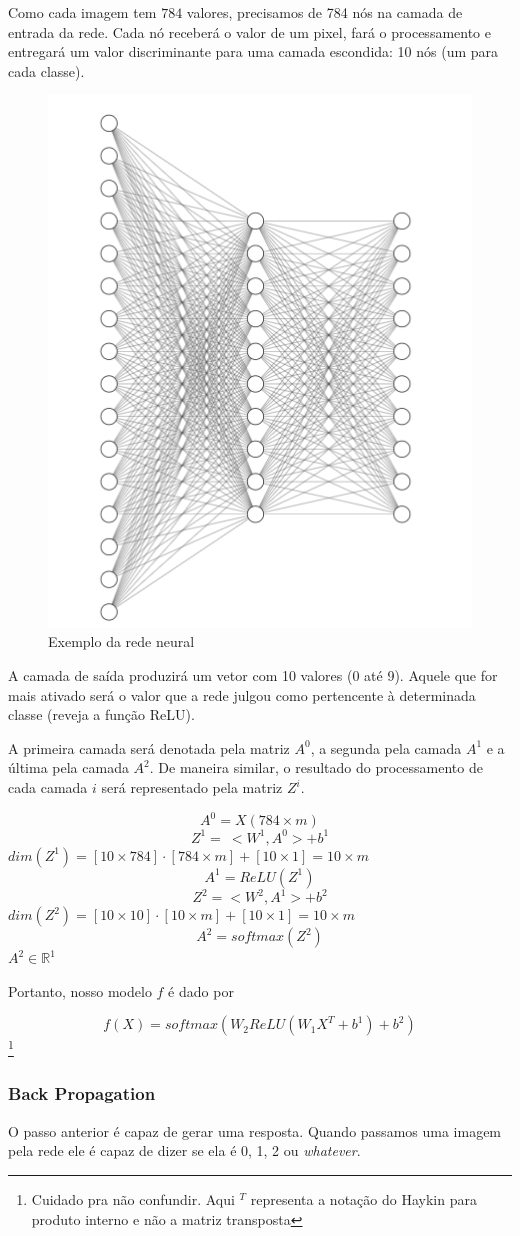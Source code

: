 Como cada imagem tem $784$ valores, precisamos de 784 nós na camada de entrada da rede. Cada nó receberá o valor de um pixel, fará o processamento e entregará um valor discriminante para uma camada escondida: 10 nós (um para cada classe). 

\begin{figure}[h!]
	\centering
	\includegraphics[width=0.3\linewidth]{imagens/rede}
	\caption{Exemplo da rede neural}
	\label{fig:rede}
\end{figure}

A camada de saída produzirá um vetor com 10 valores (0 até 9). Aquele que for mais ativado será o valor que a rede julgou como pertencente à determinada classe (reveja a função ReLU).

\begin{definicao}
A primeira camada será denotada pela matriz $A^0$, a segunda pela camada $A^1$ e a última pela camada $A^2$. 
De maneira similar, o resultado do processamento de cada camada $i$ será representado pela matriz $Z^{i}$.
\end{definicao} 

$$ A^0 = X (784 \times m)$$ 
$$ Z^1 = \ <W^1, A^0> + b^1  $$
$dim(Z^1) = \left[10 \times 784\right]  \cdot \left[ 784 \times m\right]  + \left[ 10 \times 1\right]  = 10 \times m$
$$A ^1 = ReLU(Z^1)$$
$$Z^2 = <W^2, A^1> + b^2$$
$dim(Z^2) = \left[ 10 \times 10\right]\cdot \left[ 10\times m \right]  + \left[ 10 \times 1\right] =  10 \times m$
$$A^2 = softmax(Z^2)$$
$A^2 \in \mathbb{R}^1 $

Portanto, nosso modelo $f$ é dado por 

$$f(X) = softmax(W_2 ReLU(W_1 X^T + b^1) + b^2)$$\footnote{Cuidado pra não confundir. Aqui $^T$ representa a notação do Haykin para produto interno e não a matriz transposta}

\subsubsection{Back Propagation}
O passo anterior é capaz de gerar uma resposta. Quando passamos uma imagem pela rede ele é capaz de dizer se ela é 0, 1, 2 ou \textit{whatever}. 

